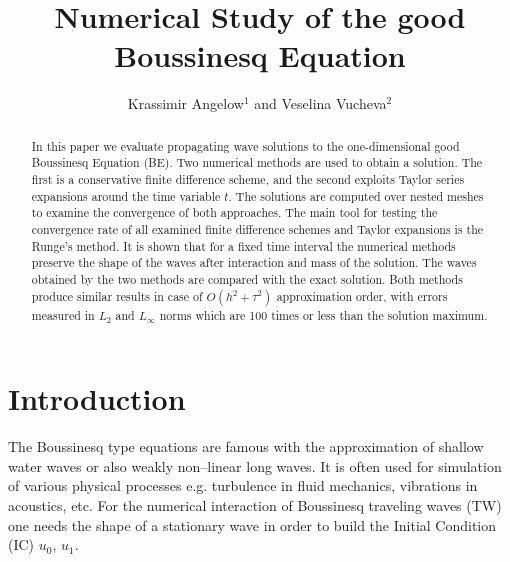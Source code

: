 \documentclass[%
 aip,
cp,  
 amsmath,amssymb,
 reprint,
]{iopconfser}
\begin{document}
\title{Numerical Study of the good Boussinesq Equation}

\author{Krassimir Angelow$^{1}$ and Veselina Vucheva$^{2}$}




\begin{abstract}
In this paper we evaluate propagating wave solutions to the one-dimensional good Boussinesq Equation (BE).
Two numerical methods are used to obtain a solution. The first is a conservative finite difference scheme, and the second exploits Taylor series expansions around the time variable $t$. 
The solutions are computed over nested meshes to examine the convergence of both approaches. The main tool for testing the convergence rate of all examined finite difference schemes and Taylor expansions is the Runge's method. It is shown that for a fixed time interval the numerical methods preserve the shape of the waves after interaction and mass of the solution. The waves obtained by the two methods are compared with the exact solution.
Both methods produce similar results in case of $O(h^{2} + \tau^2 )$ approximation order, with errors measured in $L_2$ and $L_\infty$ norms which are 100 times or less than the solution maximum.
\end{abstract}

\section{\label{sec:level1}Introduction}

The Boussinesq type equations are famous with the approximation of shallow water waves or also weakly non--linear long waves. It is often used for simulation of various physical processes e.g. turbulence in fluid mechanics, vibrations in acoustics, etc. For the numerical interaction of Boussinesq traveling waves (TW) one needs the shape of a stationary wave in order to build the Initial Condition (IC) $u_0$, $u_1$.
\end{document}
